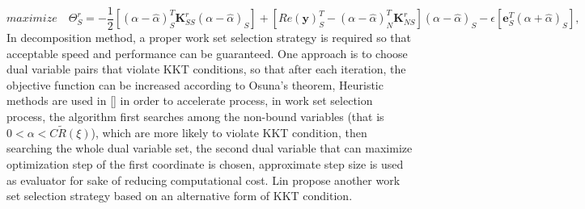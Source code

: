 \documentclass[12pt, draftclsnofoot, onecolumn]{IEEEtran}
\begin{document}
\begin{spacing}{2}
\begin{equation}
maximize\quad \Theta_{S}^{r}=-\frac{1}{2}[(\alpha-\hat{\alpha})_{S}^{T}\mathbf{K}_{SS}^{r}(\alpha-\hat{\alpha})_{S}]+[Re(\mathbf{y})_{S}^{T}-(\alpha-\hat{\alpha})_{N}^{T}\mathbf{K}_{NS}^{r}
](\alpha-\hat{\alpha})_{S}-\epsilon[\mathbf{e}_{S}^{T}(\alpha+\hat{\alpha})_{S}],
\label{subset optimization}
\end{equation}
In decomposition method, a proper work set selection strategy is required so that acceptable speed and performance can be guaranteed. One approach is to choose dual variable pairs that violate KKT conditions, so that after each iteration, the objective function can be increased according to Osuna's theorem\cite{inproved training algorithms for support vector machines}, Heuristic methods are used in [\cite{SMO}] in order to accelerate process, in work set selection process, the algorithm first searches among the non-bound variables (that is $0<\alpha<C\tilde{R}(\xi)$), which are more likely to violate KKT condition, then searching the whole dual variable set, the second dual variable that can maximize optimization step of the first coordinate is chosen, approximate step size is used as evaluator for sake of reducing computational cost. Lin propose another work set selection strategy based on an alternative form of KKT condition.


\end{spacing}
\end{document}
